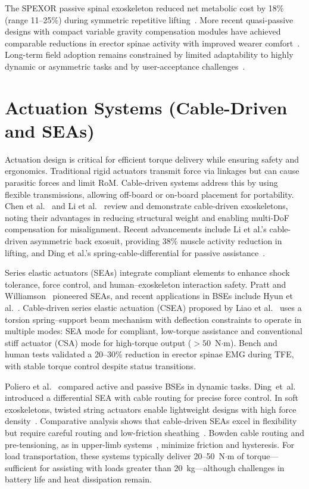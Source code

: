 The SPEXOR passive spinal exoskeleton reduced net metabolic cost by 18\% (range 11--25\%) during symmetric repetitive lifting~\cite{baltrusch2020}. More recent quasi-passive designs with compact variable gravity compensation modules have achieved comparable reductions in erector spinae activity with improved wearer comfort~\cite{song2024}. Long-term field adoption remains constrained by limited adaptability to highly dynamic or asymmetric tasks and by user-acceptance challenges~\cite{babic2021,luger2023}.

\section{Actuation Systems (Cable-Driven and SEAs)}
Actuation design is critical for efficient torque delivery while ensuring safety and ergonomics. Traditional rigid actuators transmit force via linkages but can cause parasitic forces and limit RoM. Cable-driven systems address this by using flexible transmissions, allowing off-board or on-board placement for portability. Chen et al.~\cite{chen2019} and Li et al.~\cite{li2022} review and demonstrate cable-driven exoskeletons, noting their advantages in reducing structural weight and enabling multi-DoF compensation for misalignment. Recent advancements include Li et al.'s cable-driven asymmetric back exosuit, providing 38\% muscle activity reduction in lifting, and Ding et al.'s spring-cable-differential for passive assistance~\cite{ding2023}.

Series elastic actuators (SEAs) integrate compliant elements to enhance shock tolerance, force control, and human--exoskeleton interaction safety. Pratt and Williamson~\cite{pratt1995} pioneered SEAs, and recent applications in BSEs include Hyun et al.~\cite{hyun2020}. Cable-driven series elastic actuation (CSEA) proposed by Liao et al.~\cite{liao2024} uses a torsion spring--support beam mechanism with deflection constraints to operate in multiple modes: SEA mode for compliant, low-torque assistance and conventional stiff actuator (CSA) mode for high-torque output ($>50$~N$\cdot$m). Bench and human tests validated a 20--30\% reduction in erector spinae EMG during TFE, with stable torque control despite status transitions.

Poliero et al.~\cite{poliero2022} compared active and passive BSEs in dynamic tasks. \mbox{Ding et al.}~\cite{ding2024} introduced a differential SEA with cable routing for precise force control. In soft exoskeletons, twisted string actuators enable lightweight designs with high force density~\cite{xiloyannis2019}. Comparative analysis shows that cable-driven SEAs excel in flexibility but require careful routing and low-friction sheathing~\cite{poliero2022,liao2024}. Bowden cable routing and pre-tensioning, as in upper-limb systems~\cite{tsai2019}, minimize friction and hysteresis. For load transportation, these systems typically deliver 20--50~N$\cdot$m of torque---sufficient for assisting with loads greater than 20~kg---although challenges in battery life and heat dissipation remain.

